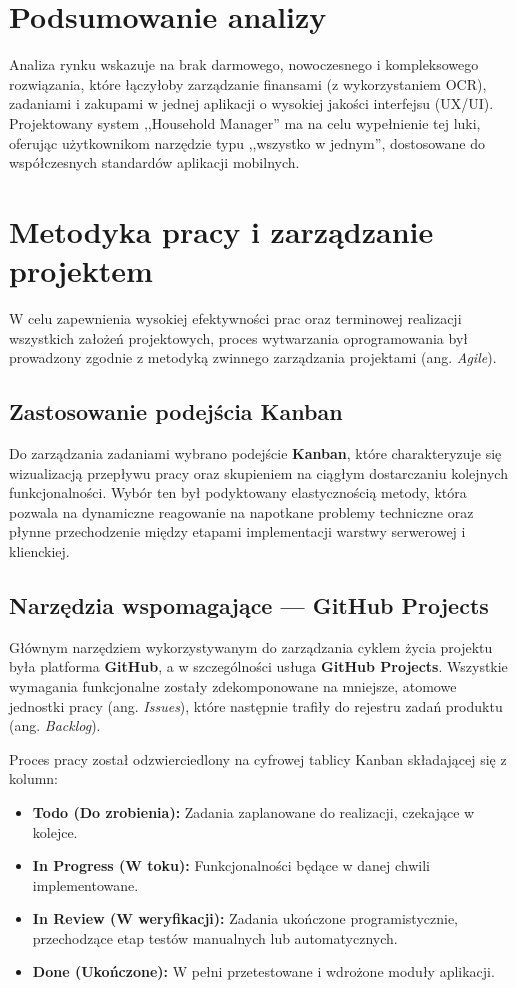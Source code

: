 \section{Podsumowanie analizy}

Analiza rynku wskazuje na brak darmowego, nowoczesnego i kompleksowego rozwiązania, które łączyłoby zarządzanie finansami (z wykorzystaniem OCR), zadaniami i zakupami w jednej aplikacji o wysokiej jakości interfejsu (UX/UI). Projektowany system ,,Household Manager'' ma na celu wypełnienie tej luki, oferując użytkownikom narzędzie typu ,,wszystko w jednym'', dostosowane do współczesnych standardów aplikacji mobilnych.

\section{Metodyka pracy i zarządzanie projektem}

W celu zapewnienia wysokiej efektywności prac oraz terminowej realizacji wszystkich założeń projektowych, proces wytwarzania oprogramowania był prowadzony zgodnie z metodyką zwinnego zarządzania projektami (ang. \textit{Agile}).

\subsection{Zastosowanie podejścia Kanban}

Do zarządzania zadaniami wybrano podejście \textbf{Kanban}, które charakteryzuje się wizualizacją przepływu pracy oraz skupieniem na ciągłym dostarczaniu kolejnych funkcjonalności. Wybór ten był podyktowany elastycznością metody, która pozwala na dynamiczne reagowanie na napotkane problemy techniczne oraz płynne przechodzenie między etapami implementacji warstwy serwerowej i klienckiej.

\subsection{Narzędzia wspomagające --- GitHub Projects}

Głównym narzędziem wykorzystywanym do zarządzania cyklem życia projektu była platforma \textbf{GitHub}, a w szczególności usługa \textbf{GitHub Projects}. Wszystkie wymagania funkcjonalne zostały zdekomponowane na mniejsze, atomowe jednostki pracy (ang. \textit{Issues}), które następnie trafiły do rejestru zadań produktu (ang. \textit{Backlog}).

Proces pracy został odzwierciedlony na cyfrowej tablicy Kanban składającej się z kolumn:
\begin{itemize}
    \item \textbf{Todo (Do zrobienia):} Zadania zaplanowane do realizacji, czekające w kolejce.
    \item \textbf{In Progress (W toku):} Funkcjonalności będące w danej chwili implementowane.
    \item \textbf{In Review (W weryfikacji):} Zadania ukończone programistycznie, przechodzące etap testów manualnych lub automatycznych.
    \item \textbf{Done (Ukończone):} W pełni przetestowane i wdrożone moduły aplikacji.
\end{itemize}

